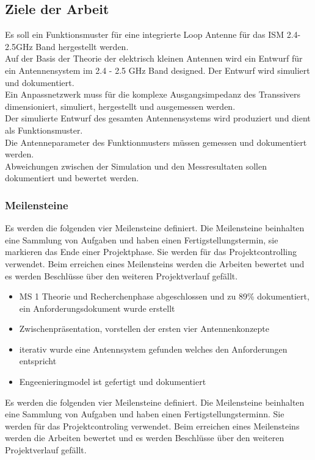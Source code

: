 \subsection{Ziele der Arbeit}
Es soll ein Funktionsmuster für eine integrierte Loop Antenne für das ISM  2.4-2.5GHz Band hergestellt werden.\\

Auf der Basis der Theorie der elektrisch kleinen Antennen wird ein Entwurf für ein Antennensystem im 2.4 - 2.5 GHz Band designed. Der Entwurf wird simuliert und dokumentiert. \\
Ein Anpassnetzwerk muss für die komplexe Ausgangsimpedanz des Transsivers dimensioniert, simuliert, hergestellt und ausgemessen werden.\\
Der simulierte Entwurf des gesamten Antennensystems wird produziert und dient als Funktionsmuster. \\
Die Antenneparameter des Funktionmusters müssen gemessen und dokumentiert werden.\\ Abweichungen zwischen der Simulation und den Messresultaten sollen dokumentiert und bewertet werden.
\subsubsection{Meilensteine}
Es werden die folgenden vier Meilensteine definiert. Die Meilensteine
beinhalten   eine Sammlung von Aufgaben und haben einen
Fertigstellungstermin, sie markieren das Ende einer Projektphase. Sie
werden für das Projektcontrolling verwendet. Beim erreichen eines Meilensteins werden die Arbeiten bewertet und es werden Beschlüsse über den weiteren Projektverlauf gefällt.
	\begin{itemize}
		\item MS 1 Theorie und Recherchenphase abgeschlossen und zu 89\% dokumentiert, ein Anforderungsdokument wurde erstellt
		\item Zwischenpräsentation, vorstellen der ersten vier Antennenkonzepte
		\item iterativ wurde eine Antennsystem gefunden welches den Anforderungen entspricht
		\item Engeenieringmodel ist gefertigt und dokumentiert

	\end{itemize}
Es werden die folgenden vier Meilensteine definiert. Die Meilensteine beinhalten   eine Sammlung von Aufgaben und haben einen Fertigstellungsterminn. Sie werden für das Projektcontroling verwendet. Beim erreichen eines Meilensteins werden die Arbeiten bewertet und es werden Beschlüsse über den weiteren Projektverlauf gefällt.



